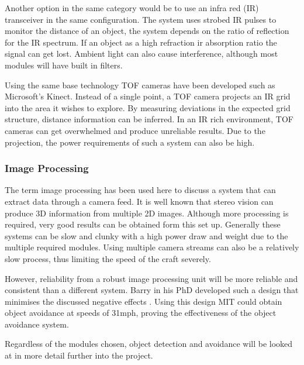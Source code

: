				Another option in the same category would be to use an infra red (IR) transceiver in the same configuration. The system uses strobed IR pulses to monitor the distance of an object, the system depends on the ratio of reflection for the IR spectrum. If an object as a high refraction ir absorption ratio the signal can get lost. Ambient light can also cause interference, although most modules will have built in filters.
				
				Using the same base technology TOF cameras have been developed such as Microsoft's Kinect. Instead of a single point, a TOF camera projects an IR grid into the area it wishes to explore. By measuring deviations in the expected grid structure, distance information can be inferred. In an IR rich environment, TOF cameras can get overwhelmed and produce unreliable results. Due to the projection, the power requirements of such a system can also be high.
		
				\subsubsection{Image Processing}
				The term image processing has been used here to discuss a system that can extract data through a camera feed. It is well known that stereo vision can produce 3D information from multiple 2D images. Although more processing is required, very good results can be obtained form this set up. Generally these systems can be slow and clunky with a high power draw and weight due to the multiple required modules. Using multiple camera streams can also be a relatively slow process, thus limiting the speed of the craft severely.
				
				However, reliability from a robust image processing unit will be more reliable and consistent than a different system. Barry in his PhD developed such a design that minimises the discussed negative effects \cite{Barry2016}. Using this design MIT could obtain object avoidance at speeds of 31mph, proving the effectiveness of the object avoidance system.
				
				Regardless of the modules chosen, object detection and avoidance will be looked at in more detail further into the project.
		
%			
		
